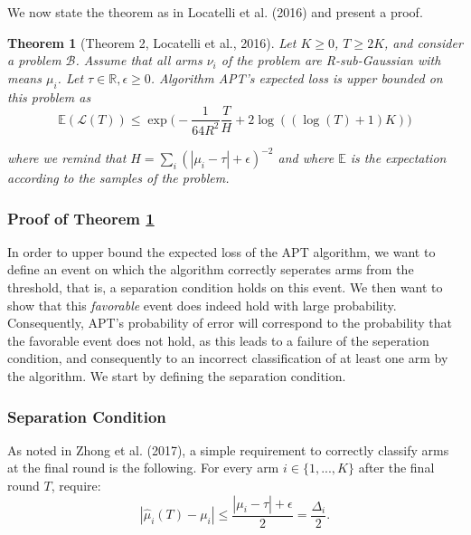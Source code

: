 \documentclass[11pt,]{article}
\newtheorem{theorem}{Theorem}
\begin{document}
We now state the theorem as in Locatelli et al. (2016) and present a
proof.

\begin{theorem}[Theorem 2, Locatelli et al., 2016] \label{theorem:LocatelliTheorem4}
Let $K \geq 0$, $T \geq 2K$, and consider a problem $\mathcal{B}$. Assume that all arms $\nu_i$ of the problem are R-sub-Gaussian with means $\mu_i$. Let $\tau \in \mathbb{R}, \epsilon \geq 0$. Algorithm APT's expected loss is upper bounded on this problem as 
\begin{equation*} \mathbb{E}(\mathcal{L}(T)) \leq \exp
\Big(-\frac{1}{64R^2}\frac{T}{H} + 2 \log((\log(T) + 1)K)\Big) \end{equation*}

where we remind that $H = \sum_i (|\mu_i - \tau | + \epsilon)^{-2}$ and where
$\mathbb{E}$ is the expectation according to the samples of the problem.
\end{theorem}

\subsubsection{\texorpdfstring{Proof of Theorem
\ref{theorem:LocatelliTheorem4}
\label{sec:UpperBoundProof}}{Proof of Theorem  }}\label{proof-of-theorem}

In order to upper bound the expected loss of the APT algorithm, we want
to define an event on which the algorithm correctly seperates arms from
the threshold, that is, a separation condition holds on this event. We
then want to show that this \emph{favorable} event does indeed hold with
large probability. Consequently, APT's probability of error will
correspond to the probability that the favorable event does not hold, as
this leads to a failure of the seperation condition, and consequently to
an incorrect classification of at least one arm by the algorithm. We
start by defining the separation condition.

\subsubsection{Separation Condition}\label{separation-condition}

As noted in Zhong et al. (2017), a simple requirement to correctly
classify arms at the final round is the following. For every arm
\(i \in \{1, ..., K\}\) after the final round \(T\), require: \[
| \hat{\mu}_{i}(T) - \mu_i | \leq \frac{|\mu_i - \tau| + \epsilon}{2} = \frac{\Delta_i}{2}.
\]
\end{document}
